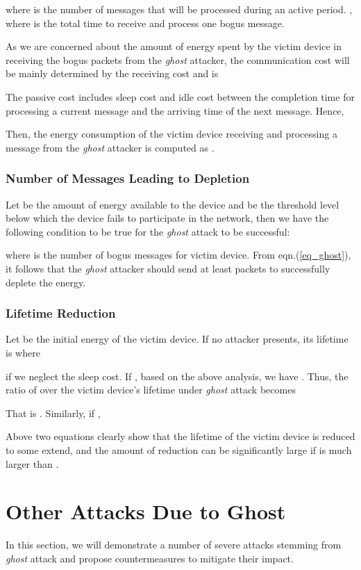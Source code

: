 \documentclass[10pt,journal,cspaper,compsoc]{IEEEtran}
\begin{document}
where  is the number of messages that will be processed during an active period. , where  is the total time to receive and process one bogus message.


As we are concerned about the amount of energy spent by the victim device  in receiving the bogus packets from the {\em ghost} attacker, the communication cost will be mainly determined by the receiving cost and is


The passive cost includes sleep cost and idle cost between the completion time for processing a current message and the arriving time of the next message. Hence,


Then, the energy consumption of the victim device receiving and processing a message from the {\em ghost} attacker is computed as .

\subsubsection{Number of Messages Leading to Depletion}
Let  be the amount of energy available to the device and  be the threshold level below which the device fails to participate in the network, then we have the following condition to be true for the {\em ghost} attack to be successful:

where  is the number of bogus messages for victim device. From eqn.(\ref{eq_ghost}), it follows that the {\em ghost} attacker should send at least  packets to successfully deplete the energy.

\subsubsection{Lifetime Reduction}
Let  be the initial energy of the victim device. If no attacker presents, its lifetime is  where

if we neglect the sleep cost. If , based on the above analysis, we have . Thus, the ratio of  over the victim device's lifetime under {\em ghost} attack becomes
      
That is . Similarly, if , 

Above two equations clearly show that the lifetime of the victim device is reduced to some extend, and the amount of reduction can be significantly large if  is much larger than .


\section {Other Attacks Due to Ghost}\label{otherattack}
In this section, we will demonstrate a number of severe attacks stemming from {\em ghost} attack and propose countermeasures to mitigate their impact.
\end{document}
